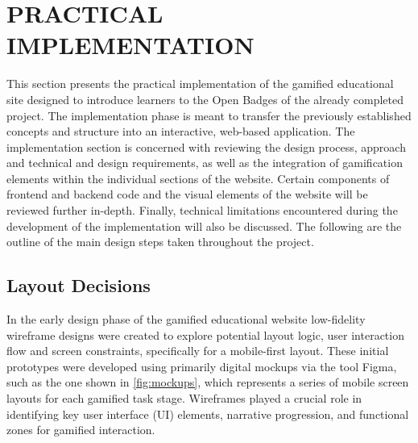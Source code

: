 \section{PRACTICAL IMPLEMENTATION}

This section presents the practical implementation of the gamified educational site designed to introduce learners to the Open Badges of the already completed project. 
The implementation phase is meant to transfer the previously established concepts and structure into an interactive, web-based application. 
The implementation section is concerned with reviewing the design process, approach and technical and design requirements, as well as the integration of gamification elements within the individual sections of the website. 
Certain components of frontend and backend code and the visual elements of the website will be reviewed further in-depth. 
Finally, technical limitations encountered during the development of the implementation will also be discussed. 
The following are the outline of the main design steps taken throughout the project.

\subsection{Layout Decisions}
In the early design phase of the gamified educational website low-fidelity wireframe designs were created to explore potential layout logic, user interaction flow and screen constraints, specifically for a mobile-first layout. 
These initial prototypes were developed using primarily digital mockups via the tool Figma, such as the one shown in \ref {fig:mockups}, which represents a series of mobile screen layouts for each gamified task stage. 
Wireframes played a crucial role in identifying key user interface (UI) elements, narrative progression, and functional zones for gamified interaction.

